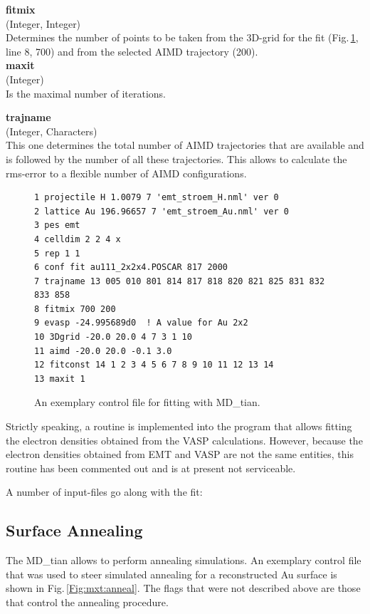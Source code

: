 \documentclass[twoside, 11pt, titlepage, captions=nooneline, a4paper, headsepline]{scrbook}%
\newcommand{\9}{\mathrm}
\newcommand{\0}{\,\mathrm}
\begin{document}
\noindent\textbf{fitmix}\\
(Integer, Integer)\\
Determines the number of points to be taken from the 3D-grid for the fit (Fig.\,\ref{Fig:mxt:fitting}, line 8, 700) and from the selected AIMD trajectory (200).\\

\noindent\textbf{maxit}\\
(Integer)\\
Is the maximal number of iterations.

\noindent\textbf{trajname}\\
(Integer, Characters)\\
This one determines the total number of AIMD trajectories that are available and is followed by the number of all these trajectories. This allows to calculate the rms-error to a flexible number of AIMD configurations.\\


\begin{figure}[t!]
\begin{verbatim}
1 projectile H 1.0079 7 'emt_stroem_H.nml' ver 0
2 lattice Au 196.96657 7 'emt_stroem_Au.nml' ver 0
3 pes emt
4 celldim 2 2 4 x
5 rep 1 1
6 conf fit au111_2x2x4.POSCAR 817 2000
7 trajname 13 005 010 801 814 817 818 820 821 825 831 832 833 858
8 fitmix 700 200
9 evasp -24.995689d0  ! A value for Au 2x2
10 3Dgrid -20.0 20.0 4 7 3 1 10
11 aimd -20.0 20.0 -0.1 3.0
12 fitconst 14 1 2 3 4 5 6 7 8 9 10 11 12 13 14
13 maxit 1 
\end{verbatim}
\caption{\label{Fig:mxt:fitting}An exemplary control file for fitting with MD\_tian.}
\end{figure}

Strictly speaking, a routine is implemented into the program that allows fitting the electron densities obtained from the VASP calculations. However, because the electron densities obtained from EMT and VASP are not the same entities, this routine has been commented out and is at present not serviceable.

A number of input-files go along with the fit:

\subsection{Surface Annealing}
\label{sec:mxt:control:annealing}
The MD\_tian allows to perform annealing simulations. An exemplary control file that was used to steer simulated annealing for a reconstructed Au surface is shown in Fig.\,\ref{Fig:mxt:anneal}. The flags that were not described above are those that control the annealing procedure.
\end{document}
